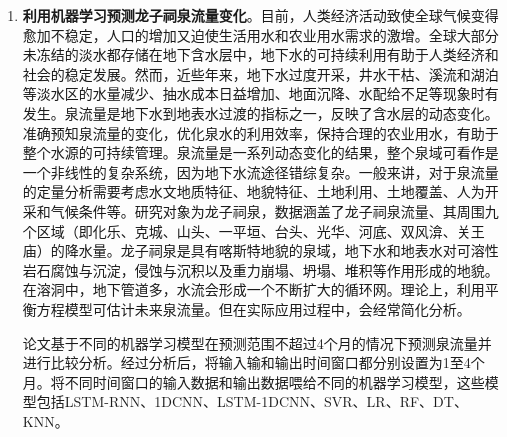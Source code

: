 \begin{enumerate}
    \item \textbf{利用机器学习预测龙子祠泉流量变化}。目前，人类经济活动致使全球气候变得愈加不稳定，人口的增加又迫使生活用水和农业用水需求的激增。全球大部分未冻结的淡水都存储在地下含水层中，地下水的可持续利用有助于人类经济和社会的稳定发展。然而，近些年来，地下水过度开采，井水干枯、溪流和湖泊等淡水区的水量减少、抽水成本日益增加、地面沉降、水配给不足等现象时有发生。泉流量是地下水到地表水过渡的指标之一，反映了含水层的动态变化。准确预知泉流量的变化，优化泉水的利用效率，保持合理的农业用水，有助于整个水源的可持续管理。泉流量是一系列动态变化的结果，整个泉域可看作是一个非线性的复杂系统，因为地下水流途径错综复杂。一般来讲，对于泉流量的定量分析需要考虑水文地质特征、地貌特征、土地利用、土地覆盖、人为开采和气候条件等。研究对象为龙子祠泉，数据涵盖了龙子祠泉流量、其周围九个区域（即化乐、克城、山头、一平垣、台头、光华、河底、双风渰、关王庙）的降水量。龙子祠泉是具有喀斯特地貌的泉域，地下水和地表水对可溶性岩石腐蚀与沉淀，侵蚀与沉积以及重力崩塌、坍塌、堆积等作用形成的地貌。在溶洞中，地下管道多，水流会形成一个不断扩大的循环网。理论上，利用平衡方程模型可估计未来泉流量。但在实际应用过程中，会经常简化分析。
    
    论文基于不同的机器学习模型在预测范围不超过4个月的情况下预测泉流量并进行比较分析。经过分析后，将输入输和输出时间窗口都分别设置为1至4个月。将不同时间窗口的输入数据和输出数据喂给不同的机器学习模型，这些模型包括LSTM-RNN、1DCNN、LSTM-1DCNN、SVR、LR、RF、DT、KNN。


\end{enumerate}
